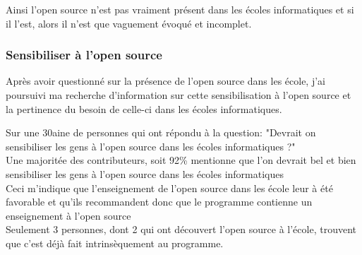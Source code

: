 				Ainsi l'open source n'est pas vraiment présent dans les écoles informatiques et si il l'est, alors il n'est que vaguement évoqué et incomplet.

			\subsubsection{Sensibiliser à l'open source}

				Après avoir questionné sur la présence de l'open source dans les école, j'ai poursuivi ma recherche d'information sur cette sensibilisation à l'open source et la pertinence du besoin de celle-ci dans les écoles informatiques.

				Sur une 30aine de personnes qui ont répondu à la question: "Devrait on sensibiliser les gens à l'open source dans les écoles informatiques ?"\\

				Une majoritée des contributeurs, soit 92\% mentionne que l'on devrait bel et bien sensibiliser les gens à l'open source dans les écoles informatiques\\

				Ceci m'indique que l'enseignement de l'open source dans les école leur à été favorable et qu'ils recommandent donc que le programme contienne un enseignement à l'open source\\

				Seulement 3 personnes, dont 2 qui ont découvert l'open source à l'école, trouvent que c'est déjà fait intrinsèquement au programme.\\

